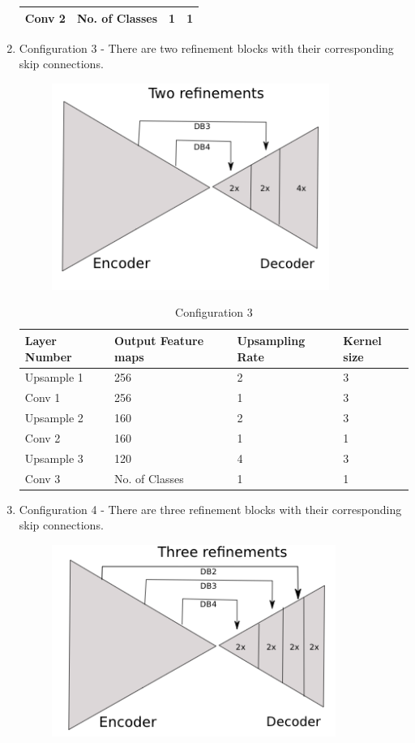 \documentclass[a4paper, 12pt]{article}
\begin{document}
\begin{enumerate}
\begin{table}[h]
\begin{tabular}{|l|l|l|l|}
			\hline
			Conv 2& No. of Classes & 1 & 1\\
			\hline
		\end{tabular}
	\end{table}
\newpage
\item Configuration 3 - There are two refinement blocks with their corresponding skip connections.
\begin{figure}[h]
	\centering
	\includegraphics[height= 0.1\textheight]{tworefinement}
	\label{image2-tworefinement}
\end{figure}
\begin{table}[h]
	\caption{Configuration 3}
	\begin{tabular}{|l|l|l|l|}
		\hline
		\textbf{Layer Number} & \textbf{Output Feature maps} & \textbf{Upsampling Rate} & \textbf{Kernel size} \\
		\hline
		Upsample 1 & 256 & 2 & 3\\
		\hline
		Conv 1& 256 & 1 & 3\\
		\hline
		Upsample 2& 160 & 2 & 3\\
		\hline
		Conv 2& 160 & 1 & 1\\
		\hline
		Upsample 3& 120 & 4 & 3\\
		\hline
		Conv 3& No. of Classes & 1 & 1\\
		\hline
	\end{tabular}
\end{table}
\item Configuration 4 - There are three refinement blocks with their corresponding skip connections.
\begin{figure}[h!]
	\centering
	\includegraphics[height= 0.1\textheight]{threerefinement}

\end{figure}
\end{enumerate}
\end{document}
